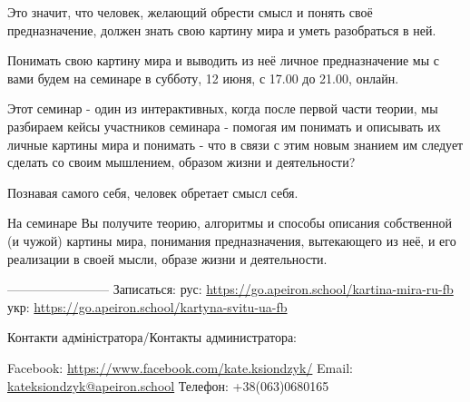 Это значит, что человек, желающий обрести смысл и понять своё предназначение,
должен знать свою картину мира и уметь разобраться в ней.

Понимать свою картину мира и выводить из неё личное предназначение мы с вами
будем на семинаре в субботу, 12 июня, с 17.00 до 21.00, онлайн.

Этот семинар - один из интерактивных, когда после первой части теории, мы
разбираем кейсы участников семинара - помогая им понимать и описывать их личные
картины мира и понимать - что в связи с этим новым знанием им следует сделать
со своим мышлением, образом жизни и деятельности?   

Познавая самого себя, человек обретает смысл себя.

На семинаре Вы получите теорию, алгоритмы и способы описания собственной (и
чужой) картины мира, понимания предназначения, вытекающего из неё, и его
реализации в своей мысли, образе жизни и деятельности.

————————
Записаться: 
рус:
\url{https://go.apeiron.school/kartina-mira-ru-fb}
укр:
\url{https://go.apeiron.school/kartyna-svitu-ua-fb}

Контакти адміністратора/Контакты администратора:

Facebook: \url{https://www.facebook.com/kate.ksiondzyk/} 
Email: \url{kateksiondzyk@apeiron.school} 
Телефон: +38(063)0680165
